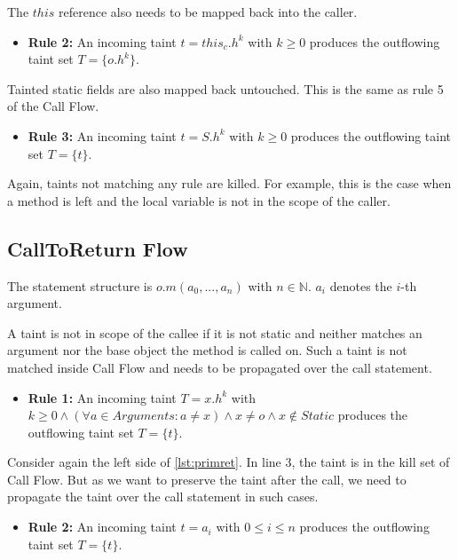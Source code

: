 \documentclass[../draft.tex]{subfiles}
\begin{document}
    The $\mathit{this}$ reference also needs to be mapped back into the caller.
    \begin{itemize}
        \item[] \textbf{Rule 2:} An incoming taint $t = \mathit{this}_c.h^k$ with $k \geq 0$ produces the outflowing taint set $T = \{o.h^k\}$. 
    \end{itemize}
    
    Tainted static fields are also mapped back untouched. This is the same as rule 5 of the Call Flow.
    \begin{itemize}
        \item[] \textbf{Rule 3:} An incoming taint $t = S.h^k$ with $k \geq 0$ produces the outflowing taint set $T = \{t\}$. 
    \end{itemize}
    
    Again, taints not matching any rule are killed. For example, this is the case when a method is left and the local variable is not in the scope of the caller.

    \subsection{CallToReturn Flow}
    The statement structure is $o.m(a_0, ..., a_n)$ with $n \in \mathbb{N}$. $a_i$ denotes the $i$-th argument.

    A taint is not in scope of the callee if it is not static and neither matches an argument nor the base object the method is called on. Such a taint is not matched inside Call Flow and needs to be propagated over the call statement.
    \begin{itemize}
        \item[] \textbf{Rule 1:} An incoming taint $T = x.h^k$ with $k \geq 0 \land \left(\forall a \in \mathit{Arguments}: a \neq x\right) \land x \neq o \land x \notin \mathit{Static}$ produces the outflowing taint set $T = \{t\}$. 
    \end{itemize}

    Consider again the left side of \autoref{lst:primret}. In line 3, the taint is in the kill set of Call Flow. But as we want to preserve the taint after the call, we need to propagate the taint over the call statement in such cases. 
    \begin{itemize}
        \item[] \textbf{Rule 2:} An incoming taint $t = a_i$ with $0 \leq i \leq n$ produces the outflowing taint set $T = \{t\}$. 
    \end{itemize}
        
\end{document}
